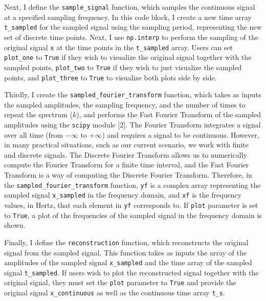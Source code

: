 \documentclass{article}
\begin{document}
Next, I define the \verb|sample_signal| function, which samples the continuous signal at a specified sampling frequency.
In this code block, I create a new time array \verb|t_sampled| for the sampled signal using the sampling period, representing the new set of discrete time points. 
Next, I use \verb|np.interp| to perform the sampling of the original signal \verb|x| at the time points in the \verb|t_sampled| array.
Users can set \verb|plot_one| to \verb|True| if they wish to visualize the original signal together with the sampled points, \verb|plot_two| to \verb|True| if they wish to just visualize the sampled points, and \verb|plot_three| to \verb|True| to visualize both plots side by side.

Thirdly, I create the \verb|sampled_fourier_transform| function, which takes as inputs the sampled amplitudes, the sampling frequency, and the number of times to repeat the spectrum ($k$), 
and performs the Fast Fourier Transform of the sampled amplitudes using the \verb|scipy| module [2].
The Fourier Transform integrates a signal over all time (from $-\infty$ to $+\infty$) and requires a signal to be continuous. 
However, in many practical situations, such as our current scenario, we work with finite and discrete signals. 
The Discrete Fourier Transform allows us to numerically compute the Fourier Transform for a finite time interval, 
and the Fast Fourier Transform is a way of computing the Discrete Fourier Transform. 
Therefore, in the \verb|sampled_fourier_transform| function, \verb|yf| is a complex array representing the sampled signal \verb|x_sampled| in the frequency domain, 
and \verb|xf| is the frequency values, in Hertz, that each element in \verb|yf| corresponds to. %
If \verb|plot| parameter is set to \verb|True|, a plot of the frequencies of the sampled signal in the frequency domain is shown.

Finally, I define the \verb|reconstruction| function, which reconstructs the original signal from the sampled signal.
This function takes as inputs the array of the amplitudes of the sampled signal \verb|x_sampled| and the time array of the sampled signal \verb|t_sampled|.
If users wish to plot the reconstructed signal together with the original signal, they must set the \verb|plot| parameter to \verb|True| and provide the original signal \verb|x_continuous| as well as the continuous time array \verb|t_s|.
\end{document}
